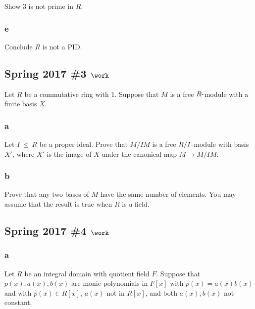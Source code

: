 Show 3 is not prime in \(R\).

\hypertarget{e}{%
\subsubsection{e}\label{e}}

Conclude \(R\) is not a PID.

\hypertarget{spring-2017-3-work}{%
\subsection{\texorpdfstring{Spring 2017 \#3
\(\work\)}{Spring 2017 \#3 \textbackslash work}}\label{spring-2017-3-work}}

Let \(R\) be a commutative ring with 1. Suppose that \(M\) is a free
\(R{\hbox{-}}\)module with a finite basis \(X\).

\hypertarget{a-42}{%
\subsubsection{a}\label{a-42}}

Let \(I {~\trianglelefteq~}R\) be a proper ideal. Prove that \(M/IM\) is
a free \(R/I{\hbox{-}}\)module with basis \(X'\), where \(X'\) is the
image of \(X\) under the canonical map \(M\to M/IM\).

\hypertarget{b-32}{%
\subsubsection{b}\label{b-32}}

Prove that any two bases of \(M\) have the same number of elements. You
may assume that the result is true when \(R\) is a field.

\hypertarget{spring-2017-4-work}{%
\subsection{\texorpdfstring{Spring 2017 \#4
\(\work\)}{Spring 2017 \#4 \textbackslash work}}\label{spring-2017-4-work}}

\hypertarget{a-43}{%
\subsubsection{a}\label{a-43}}

Let \(R\) be an integral domain with quotient field \(F\). Suppose that
\(p(x), a(x), b(x)\) are monic polynomials in \(F[x]\) with
\(p(x) = a(x) b(x)\) and with \(p(x) \in R[x]\), \(a(x)\) not in
\(R[x]\), and both \(a(x), b(x)\) not constant.

